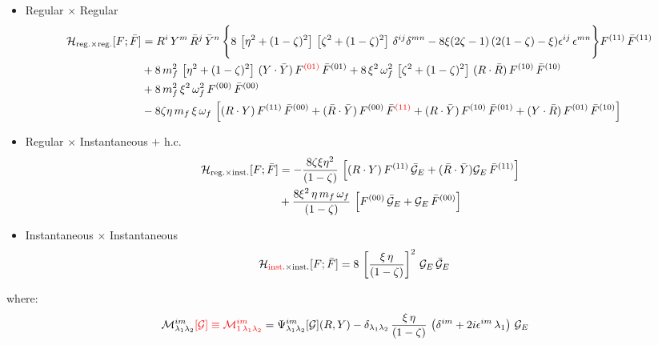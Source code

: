\documentclass[9pt]{article}
\newcommand{\chg}[1]{{\color{red}#1}}
\numberwithin{equation}{section}
\begin{document}
\begin{itemize}
    \item Regular $\times$ Regular
    \begin{align}
        \mathcal{H}_{\mathrm{reg.}\times \mathrm{reg.}}[F;\Bar{F}] & = R^{i}\,Y^{m}\,\Bar{R}^{j}\,\Bar{Y}^{n}\,\Bigg\{8\,\left[\eta^{2}+(1-\zeta)^{2}\right]\,\left[\zeta^{2} + (1-\zeta)^{2}\right]\,\delta^{ij}\delta^{mn}-8\xi(2\zeta - 1)\, (2(1-\zeta)-\xi)\epsilon^{ij}\,\epsilon^{mn}\Bigg\}F^{(11)}\,\Bar{F}^{(11)}\notag \\ & +8\,m^{2}_{f}\,\left[\eta^{2} + (1-\zeta)^{2}\right]\, (Y\cdot \Bar{Y})\,F^{\chg{(01)}}\,\Bar{F}^{(01)}+8\,\xi^{2}\,\omega^{2}_{f}\,\left[\zeta^{2}+(1-\zeta)^{2}\right]\, (R\cdot \Bar{R})\, F^{(10)}\,\Bar{F}^{(10)} \notag \\ & + 8\,m^{2}_{f}\,\xi^{2}\,\omega^{2}_{f}\,F^{(00)}\,\Bar{F}^{(00)}\notag \\ & -8\zeta\eta\, m_{f}\,\xi\,\omega_{f}\, \left[(R\cdot Y)\,F^{(11)}\,\Bar{F}^{(00)} + (\Bar{R}\cdot \Bar{Y})\,F^{(00)}\,\Bar{F}^{\chg{(11)}} + (R\cdot \Bar{Y})\,F^{(10)}\,\Bar{F}^{(01)} + (Y\cdot \Bar{R})\,F^{(01)}\,\Bar{F}^{(10)}\right]
    \label{chg:F02}\end{align}
    \item Regular $\times$ Instantaneous $+$ h.c.
    \begin{align}
        \mathcal{H}_{\mathrm{reg.}\times \mathrm{inst.}}[F;\Bar{F}] & = -\frac{8\zeta\xi\eta^{2}}{(1-\zeta)}\, \left[(R\cdot Y)\,F^{(11)}\,\mathcal{\Bar{G}}_{E} + (\Bar{R}\cdot \Bar{Y})\mathcal{G}_{E}\,\Bar{F}^{(11)}\right]\notag \\ & +\frac{8\xi^{2}\,\eta\,m_{f}\,\omega_{f}}{(1-\zeta)}\,\left[F^{(00)}\,\mathcal{\Bar{G}}_{E} + \mathcal{G}_{E}\,\Bar{F}^{(00)}\right]
    \end{align}
    \item Instantaneous $\times$ Instantaneous
    \begin{align}
       \mathcal{H}_{\chg{\mathrm{inst.}}\times \mathrm{inst.}}[F;\Bar{F}] & = 8\,\left[\frac{\xi\,\eta}{(1-\zeta)}\right]^{2}\, \mathcal{G}_{E}\, \mathcal{\Bar{G}}_{E}
    \label{chg:lab}\end{align}
\end{itemize}
where: 
\begin{align}
\mathcal{M}^{im}_{\lambda_{1}\lambda_{2}}\chg{[\mathcal{G}] \equiv \mathcal{M}^{im}_{1\,\lambda_{1}\lambda_{2}}} & = \Psi^{im}_{\lambda_{1}\lambda_{2}}[\mathcal{G}](R,Y) - \delta_{\lambda_{1}\lambda_{2}}\,\frac{\xi\,\eta}{(1-\zeta)}\,\left(\delta^{im}+2i\epsilon^{im}\,\lambda_{1}\right)\,\mathcal{G}_{E}
\label{chg:M1}\end{align}
\end{document}
